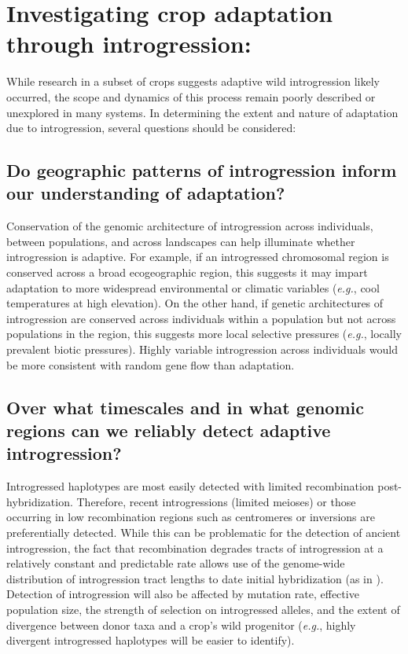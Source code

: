 \documentclass[11pt]{article}
\begin{document}
\section*{Investigating crop adaptation through introgression:}

While research in a subset of crops suggests adaptive wild introgression likely occurred, the scope and dynamics of this process remain poorly described or unexplored in many systems.
In determining the extent and nature of adaptation due to introgression, several questions should be considered:

\subsection*{Do geographic patterns of introgression inform our understanding of adaptation?}
Conservation of the genomic architecture of introgression across individuals,  between populations, and across landscapes can help illuminate whether introgression is adaptive.
For example, if an introgressed chromosomal region is conserved across a broad ecogeographic region, this suggests it may impart adaptation to more widespread environmental or climatic variables (\emph{e.g.}, cool temperatures at high elevation).
On the other hand, if genetic architectures of introgression are conserved across individuals within a population but not across populations in the region, this suggests more local selective pressures (\emph{e.g.}, locally prevalent biotic pressures).
Highly variable introgression across individuals would be more consistent with random gene flow than adaptation.

\subsection*{Over what timescales and in what genomic regions can we reliably detect adaptive introgression?}
Introgressed haplotypes are most easily detected with limited recombination post-hybridization.
Therefore, recent introgressions (limited meioses) or those occurring in low recombination regions such as centromeres or inversions are preferentially detected.
While this can be problematic for the detection of ancient introgression, the fact that recombination degrades tracts of introgression at a relatively constant and predictable rate allows use of the genome-wide distribution of introgression tract lengths to date initial hybridization (as in \citealt{Poets2015}).
Detection of introgression will also be affected by mutation rate, effective population size, the strength of selection on introgressed alleles, and the extent of divergence between donor taxa and a crop's wild progenitor (\emph{e.g.}, highly divergent introgressed haplotypes will be easier to identify).
\end{document}
